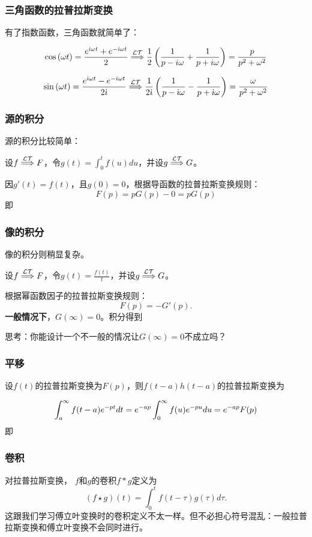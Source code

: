 \documentclass[CJK]{beamer}
\begin{document}
\begin{frame}
  \frametitle{三角函数的拉普拉斯变换}
  
  有了指数函数，三角函数就简单了：{\blue
  $$ \cos{(\omega t)} = \frac{e^{{\dot{\imath}} \omega t}+e^{-{\dot{\imath}} \omega t}}{2}  \stackrel{\mathcal{LT}}{\Longrightarrow} \frac{1}{2}\left(\frac{1}{p-i\omega} +  \frac{1}{p+i\omega}\right) = \frac{p}{p^2+\omega^2} $$

  $$ \sin{(\omega t)} = \frac{e^{{\dot{\imath}} \omega t}-e^{-{\dot{\imath}} \omega t}}{2{\dot{\imath}}}  \stackrel{\mathcal{LT}}{\Longrightarrow} \frac{1}{2{\dot{\imath}}}\left(\frac{1}{p-{\dot{\imath}}\omega} - \frac{1}{p+{\dot{\imath}}\omega}\right) = \frac{\omega}{p^2+\omega^2} $$}
  
\end{frame}


\begin{frame}
\frametitle{源的积分}

源的积分比较简单：

\skiplines

设$f\stackrel{\mathcal{LT}}{\Longrightarrow} F$，令$g(t) = \int_0^tf(u)du$，并设$g\stackrel{\mathcal{LT}}{\Longrightarrow} G$。

因$g'(t)=f(t)$，且$g(0)=0$，根据导函数的拉普拉斯变换规则：
$$F(p) = pG(p) - 0 = pG(p)$$
即


\end{frame}


\begin{frame}
\frametitle{像的积分}

像的积分则稍显复杂。

\skipline

设$f\stackrel{\mathcal{LT}}{\Longrightarrow} F$，令$g(t) = \frac{f(t)}{t}$，并设$g\stackrel{\mathcal{LT}}{\Longrightarrow} G$。

根据幂函数因子的拉普拉斯变换规则：
$$ F(p) = -G'(p). $$
{\bf 一般情况下}，$G(\infty) = 0$。积分得到

{\small 思考：你能设计一个不一般的情况让$G(\infty)=0$不成立吗？}



\end{frame}


\begin{frame}
\frametitle{平移}

设$f(t)$的拉普拉斯变换为$F(p)$，则$f(t-a)h(t-a)$的拉普拉斯变换为

$$\int_a^\infty f(t-a) e^{-pt} dt = e^{-ap} \int_0^\infty f(u)e^{-pu}du = e^{-ap}F(p) $$
即

\end{frame}


\begin{frame}
\frametitle{卷积}

对拉普拉斯变换， $f$和$g$的卷积$f*g$定义为
$$ (f\star g)(t) = \int_0^t f(t-\tau)g(\tau)d\tau. $$
这跟我们学习傅立叶变换时的卷积定义不太一样。但不必担心符号混乱：一般拉普拉斯变换和傅立叶变换不会同时进行。


\end{frame}
\end{document}
